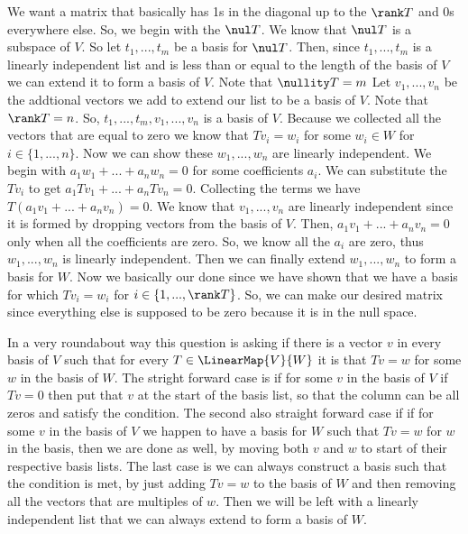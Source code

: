 \begin{q}[3]
    We want a matrix that basically has 1s in the diagonal up to the $ \rank T $ and 0s everywhere else. 
    So, we begin with the $ \nul T $. 
    We know that $ \nul T $ is a subspace of $ V $. 
    So let $ t_1, ..., t_m $ be a basis for $ \nul T $. 
    Then, since $ t_1, ..., t_m $ is a linearly independent list and is less than or equal to the length of the basis of $ V $ we can extend it to form a basis of $ V $.
    Note that $ \nullity T = m $
    Let $ v_1, ..., v_n $ be the addtional vectors we add to extend our list to be a basis of $ V $. 
    Note that $ \rank T = n $. 
    So, $ t_1, ..., t_m , v_1, ..., v_n $ is a basis of $ V $. 
    Because we collected all the vectors that are equal to zero we know that $ Tv_i = w_i $ for some $ w_i \in W $ for $ i \in \{1, ..., n\} $. 
    Now we can show these $ w_1, ..., w_n $ are linearly independent. 
    We begin with $ a_1w_1 + ... + a_n w_n = 0 $ for some coefficients $ a_i $. 
    We can substitute the $ Tv_i $ to get $ a_1Tv_1 + ... + a_n Tv_n = 0 $. 
    Collecting the terms we have $ T(a_1v_1 + ... + a_n v_n) = 0 $. 
    We know that $ v_1, ..., v_n $ are linearly independent since it is formed by dropping vectors from the basis of $ V $. 
    Then, $ a_1 v_1 + ... + a_n v_n = 0 $ only when all the coefficients are zero.
    So, we know all the $ a_i $ are zero, thus $ w_1, ..., w_n $ is linearly independent. 
    Then we can finally extend $ w_1, ..., w_n $ to form a basis for $ W $. 
    Now we basically our done since we have shown that we have a basis for which $ Tv_i = w_i $ for $ i \in \{1, ..., \rank T\} $. 
    So, we can make our desired matrix since everything else is supposed to be zero because it is in the null space. 
\end{q}
\begin{q}[4]
    In a very roundabout way this question is asking if there is a vector $ v $  in every basis of $ V $ such that for every 
    $ T \in \LinearMap{V}{W} $ it is that $ Tv = w $ for some $ w $ in the basis of $ W $. 
    The stright forward case is if for some $ v $ in the basis of $ V $ if $ Tv = 0 $ then put that $ v $ at the start of the basis list, so that the column can be all zeros and satisfy the condition.
    The second also straight forward case if if for some $ v $ in the basis of $ V $ we happen to have a basis for $ W $ such that $ Tv = w $ for $ w $ in the basis, then we are done as well, by moving both $ v $ and $ w $ to start of their respective basis lists.
    The last case is we can always construct a basis such that the condition is met, by just adding $ Tv = w $ to the basis of $ W $ and then removing all the vectors that are multiples of $ w $. 
    Then we will be left with a linearly independent list that we can always extend to form a basis of $ W $. 
\end{q}

